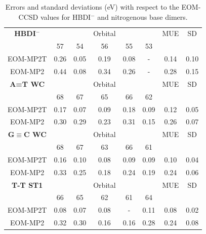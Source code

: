 \documentclass[12pt,nofootinbib]{revtex4}
\begin{document}
\begin{table}[!htbp]
  \centering
  \caption{Errors and standard deviations (eV) with respect to the EOM-CCSD values for HBDI$^{-}$ and nitrogenous base dimers.}
    \begin{tabular}{c|ccccc|cc}
    \toprule
    \textbf{HBDI$^{-}$} &       &       & Orbital &       &       & MUE   & SD \\
          & 57    & 54    & 56    & 55    & 53    &       &  \\
          \hline
    EOM-MP2T & 0.26  & 0.05  & 0.19  & 0.08  & -     & 0.14  & 0.10 \\
    EOM-MP2 & 0.44  & 0.08  & 0.34  & 0.26  & -     & 0.28  & 0.15 \\
     \hline
    \textbf{A=T WC} &       &       & Orbital &       &       & MUE   & SD \\
          & 68    & 67    & 65    & 66    & 62    &       &  \\
          \hline
    EOM-MP2T & 0.17  & 0.07  & 0.09  & 0.18  & 0.09  & 0.12  & 0.05 \\
    EOM-MP2 & 0.30  & 0.29  & 0.23  & 0.31  & 0.15  & 0.26  & 0.07 \\
       \hline
    \textbf{G$\equiv$C WC} &       &       & Orbital &       &       & MUE   & SD \\
          & 68    & 67    & 63    & 66    & 61    &       &  \\
          \hline
    EOM-MP2T & 0.16  & 0.10  & 0.08  & 0.09  & 0.09  & 0.10  & 0.04 \\
    EOM-MP2 & 0.33  & 0.25  & 0.18  & 0.24  & 0.19  & 0.24  & 0.06 \\
    \hline
    \textbf{T-T ST1} &       &       & Orbital &       &       & MUE   & SD \\
          & 66    & 65    & 62    & 61    & 64    &       &  \\
    \hline
    EOM-MP2T & 0.08  & 0.07  & 0.08  & -     & 0.11  & 0.08  & 0.02 \\
    EOM-MP2 & 0.32  & 0.30  & 0.16  &  0.16  & 0.28  & 0.24  & 0.08 \\
    \hline\hline
    \end{tabular}%
  \label{tab:hbdi-dimers}%
\end{table}%
\end{document}

